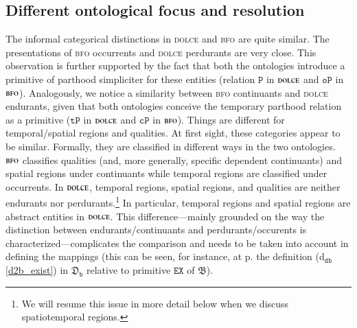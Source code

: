 \documentclass[ao]{iosart2x}
\newcommand{\dbDefLabel}{\textrm{d$_\texttt{db}$}}
\newcommand{\refdbdf}[1]{({\dbDefLabel}\ref{#1})}
\newcommand{\pr}[1]{\mathtt{#1}}
\newcommand{\cn}[1]{\mathtt{#1}}
\newcommand\textequal{%
 \rule[.08ex]{5pt}{0.35pt}\llap{\rule[.78ex]{5pt}{0.35pt}}}
\newcommand{\sdef}{{\hspace{1.5pt}:\hspace{-2.5pt}\textequal\hspace{3pt}}}
\newcommand{\dolce}{{\textsc{dolce}}}
\newcommand{\bfo}{{\textsc{bfo}}}
\newcommand {\thbfo} {\ensuremath{\mathfrak{B}}}
\newcommand {\thdolcedbmap} {\ensuremath{\mathfrak{D}_\texttt{b}}}
\newcommand {\TPd} {\ensuremath{\pr{tP}}}
\newcommand {\Pd} {\ensuremath{\pr{P}}}
\newcommand{\procbcat}{\cn{proc}}
\newcommand{\bfocpart}{\pr{cP}}
\newcommand{\bfoopart}{\pr{oP}}
\newcommand{\bfoexist}{\pr{EX}}
\newcommand{\bfoiof}[1]{{\,::_{#1\:\!}}}
\begin{document}
%


\subsection{Different ontological focus and resolution}\label{sect_diff_resolution}

The informal categorical distinctions in {\dolce} and {\bfo} are quite similar. The presentations of {\bfo} occurrents and {\dolce} perdurants are very close. This observation is further supported by the fact that both the ontologies introduce a primitive of parthood simpliciter for these entities (relation $\Pd$ in {$\dolce$} and $\bfoopart$ in {$\bfo$}). 
Analogously, we notice a similarity between {\bfo} continuants and {\dolce} endurants, given that both ontologies conceive the temporary parthood relation as a primitive ($\TPd$ in {$\dolce$} and $\bfocpart$ in {$\bfo$}).
Things are different for temporal/spatial  regions and qualities. At first sight, these categories appear to be similar. Formally, they are classified in different ways in the two ontologies. 
{$\bfo$} classifies qualities (and, more generally, specific dependent continuants) and spatial regions under continuants while temporal regions are classified under occurrents. In {$\dolce$}, temporal regions, spatial regions, and qualities are neither endurants nor perdurants.\footnote{We will resume this issue in more detail below when we discuss spatiotemporal regions.} In particular, temporal regions and spatial regions are abstract entities in {$\dolce$}. This difference---mainly grounded on the way the distinction between endurants/continuants  and perdurants/occurents is characterized---complicates the comparison and needs to be taken into account in defining the mappings (this can be seen, for instance, at p.\pageref{d2b_exist} the definition \refdbdf{d2b_exist} in $\thdolcedbmap$ relative to primitive $\bfoexist$ of {$\thbfo$}).      
\end{document}
